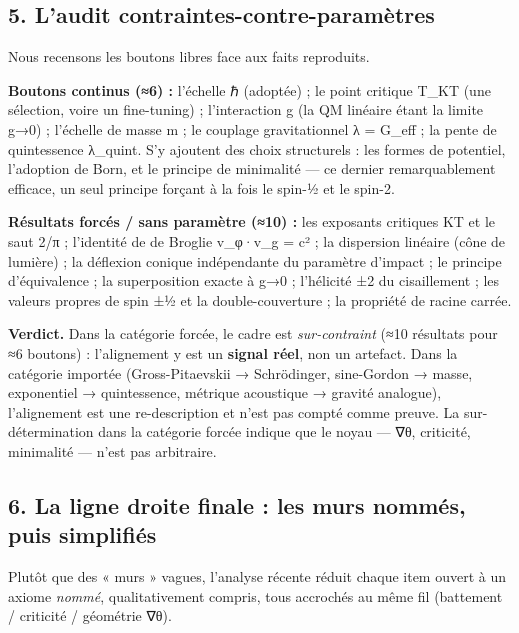\documentclass[11pt]{article}
\begin{document}
\hypertarget{laudit-contraintes-contre-paramuxe8tres}{%
\subsection{5. L'audit
contraintes-contre-paramètres}\label{laudit-contraintes-contre-paramuxe8tres}}

Nous recensons les boutons libres face aux faits reproduits.

\textbf{Boutons continus (≈6) :} l'échelle ℏ (adoptée) ; le point
critique T\_KT (une sélection, voire un fine-tuning) ; l'interaction g
(la QM linéaire étant la limite g→0) ; l'échelle de masse m ; le
couplage gravitationnel λ = G\_eff ; la pente de quintessence λ\_quint.
S'y ajoutent des choix structurels : les formes de potentiel, l'adoption
de Born, et le principe de minimalité --- ce dernier remarquablement
efficace, un seul principe forçant à la fois le spin-½ et le spin-2.

\textbf{Résultats forcés / sans paramètre (≈10) :} les exposants
critiques KT et le saut 2/π ; l'identité de de Broglie v\_φ·v\_g = c² ;
la dispersion linéaire (cône de lumière) ; la déflexion conique
indépendante du paramètre d'impact ; le principe d'équivalence ; la
superposition exacte à g→0 ; l'hélicité ±2 du cisaillement ; les valeurs
propres de spin ±½ et la double-couverture ; la propriété de racine
carrée.

\textbf{Verdict.} Dans la catégorie forcée, le cadre est
\emph{sur-contraint} (≈10 résultats pour ≈6 boutons) : l'alignement y
est un \textbf{signal réel}, non un artefact. Dans la catégorie importée
(Gross-Pitaevskii → Schrödinger, sine-Gordon → masse, exponentiel →
quintessence, métrique acoustique → gravité analogue), l'alignement est
une re-description et n'est pas compté comme preuve. La
sur-détermination dans la catégorie forcée indique que le noyau --- ∇θ,
criticité, minimalité --- n'est pas arbitraire.

\hypertarget{la-ligne-droite-finale-les-murs-nommuxe9s-puis-simplifiuxe9s}{%
\subsection{6. La ligne droite finale : les murs nommés, puis
simplifiés}\label{la-ligne-droite-finale-les-murs-nommuxe9s-puis-simplifiuxe9s}}

Plutôt que des « murs » vagues, l'analyse récente réduit chaque item
ouvert à un axiome \emph{nommé}, qualitativement compris, tous accrochés
au même fil (battement / criticité / géométrie ∇θ).
\end{document}
